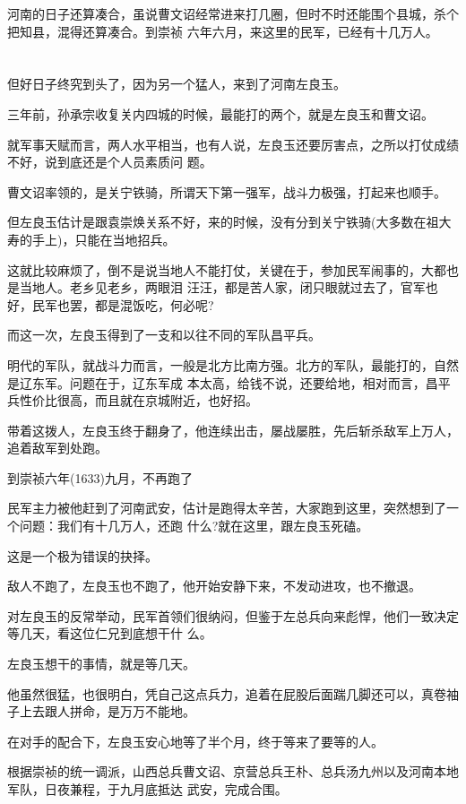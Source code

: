 \documentclass[11pt,a4paper,onecolumn]{article}
\begin{document}
河南的日子还算凑合，虽说曹文诏经常进来打几圈，但时不时还能围个县城，杀个把知县，混得还算凑合。到崇祯
六年六月，来这里的民军，已经有十几万人。

\section[\thesection]{}

但好日子终究到头了，因为另一个猛人，来到了河南\myrule 左良玉。

三年前，孙承宗收复关内四城的时候，最能打的两个，就是左良玉和曹文诏。

就军事天赋而言，两人水平相当，也有人说，左良玉还要厉害点，之所以打仗成绩不好，说到底还是个人员素质问
题。

曹文诏率领的，是关宁铁骑，所谓天下第一强军，战斗力极强，打起来也顺手。

但左良玉估计是跟袁崇焕关系不好，来的时候，没有分到关宁铁骑(大多数在祖大寿的手上)，只能在当地招兵。

这就比较麻烦了，倒不是说当地人不能打仗，关键在于，参加民军闹事的，大都也是当地人。老乡见老乡，两眼泪
汪汪，都是苦人家，闭只眼就过去了，官军也好，民军也罢，都是混饭吃，何必呢?

而这一次，左良玉得到了一支和以往不同的军队\myrule 昌平兵。

明代的军队，就战斗力而言，一般是北方比南方强。北方的军队，最能打的，自然是辽东军。问题在于，辽东军成
本太高，给钱不说，还要给地，相对而言，昌平兵性价比很高，而且就在京城附近，也好招。

带着这拨人，左良玉终于翻身了，他连续出击，屡战屡胜，先后斩杀敌军上万人，追着敌军到处跑。

到崇祯六年(1633)九月，不再跑了

民军主力被他赶到了河南武安，估计是跑得太辛苦，大家跑到这里，突然想到了一个问题：我们有十几万人，还跑
什么?就在这里，跟左良玉死磕。

这是一个极为错误的抉择。

敌人不跑了，左良玉也不跑了，他开始安静下来，不发动进攻，也不撤退。

对左良玉的反常举动，民军首领们很纳闷，但鉴于左总兵向来彪悍，他们一致决定等几天，看这位仁兄到底想干什
么。

左良玉想干的事情，就是等几天。

他虽然很猛，也很明白，凭自己这点兵力，追着在屁股后面踹几脚还可以，真卷袖子上去跟人拼命，是万万不能地。

在对手的配合下，左良玉安心地等了半个月，终于等来了要等的人。

根据崇祯的统一调派，山西总兵曹文诏、京营总兵王朴、总兵汤九州以及河南本地军队，日夜兼程，于九月底抵达
武安，完成合围。
\end{document}
